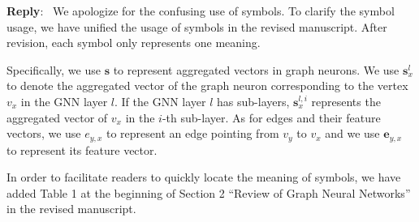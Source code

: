 \documentclass[12pt]{article}
\newcounter{reviewer}
\newcounter{point}[reviewer]
\newenvironment{reply}
   {\medskip \noindent \textbf{Reply}:\  }
   {\medskip}
\begin{document}
\begin{reply}
    We apologize for the confusing use of symbols.
    To clarify the symbol usage, we have unified the usage of symbols in the revised manuscript.
    After revision, each symbol only represents one meaning.
    
    Specifically, we use $\boldsymbol{s}$ to represent aggregated vectors in graph neurons.
    We use $\boldsymbol{s}^l_x$ to denote the aggregated vector of the graph neuron corresponding to the vertex $v_x$ in the GNN layer $l$.
    If the GNN layer $l$ has sub-layers, $\boldsymbol{s}^{l,i}_x$ represents the aggregated vector of $v_x$ in the $i$-th sub-layer.
    As for edges and their feature vectors, we use $e_{y,x}$ to represent an edge pointing from $v_y$ to $v_x$ and we use $\boldsymbol{e}_{y,x}$ to represent its feature vector.
    
    In order to facilitate readers to quickly locate the meaning of  symbols, we have added Table 1 at the beginning of Section 2 ``Review of Graph Neural Networks'' in the revised manuscript.
    

\end{reply}
\end{document}
